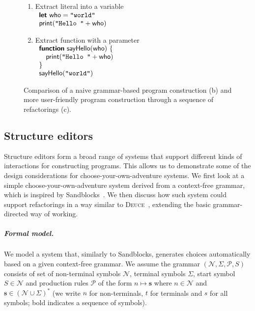 \documentclass[a4paper,UKenglish,cleveref, autoref, thm-restate]{lipics-v2021}
\newcommand{\ident}[1]{\textsf{#1}}
\newcommand{\kvd}[1]{\textsf{\bfseries #1}}
\begin{document}
\begin{figure}[t]
\begin{minipage}[t]{.5\textwidth}
\begin{enumerate}
\item Extract literal into a variable\\[0.75em]
  $\begin{array}{l}
  \kvd{let}~\ident{who} = \texttt{''world''}\\
  \ident{print}(\texttt{''Hello ''} + \ident{who})
  \end{array}$

\item Extract function with a parameter\\[0.75em]
  $\begin{array}{l}
  \kvd{function}~\ident{sayHello}(\ident{who})~\{\\
  \quad\ident{print}(\texttt{''Hello ''} + \ident{who})\\
  \}\\
  \ident{sayHello}(\texttt{''world''})
  \end{array}$

\end{enumerate}
\end{minipage}
\caption{Comparison of a naive grammar-based program construction (b) and more user-friendly
  program construction through a sequence of refactorings (c).}
\label{fig:grammar}
\end{figure}

\subsection{Structure editors}
Structure editors form a broad range of systems that support different kinds of interactions
for constructing programs. This allows us to demonstrate some of the design considerations for
choose-your-own-adventure systems. We first look at a simple choose-your-own-adventure system
derived from a context-free grammar, which is inspired by Sandblocks~\cite{beckmann-2023-all}.
We then discuss how such system could support refactorings in a way similar to
\textsc{Deuce}~\cite{hempel-2018-deuce}, extending the basic grammar-directed way of working.

\subparagraph{Formal model.}
We model a system that, similarly to Sandblocks, generates choices automatically based on a given
context-free grammar. We assume the grammar $(\mathcal{N},\Sigma,\mathcal{P},S)$ consists of set of
non-terminal symbols $\mathcal{N}$, terminal symbols $\Sigma$, start symbol $S\in\mathcal{N}$
and production rules $\mathcal{P}$ of the form $n\mapsto\boldsymbol{s}$ where
$n\in\mathcal{N}$ and $\boldsymbol{s}\in(\mathcal{N}\cup\Sigma)^{*}$ (we write $n$ for non-terminals,
$t$ for terminals and $s$ for all symbols; bold indicates a sequence of symbols).
\end{document}
